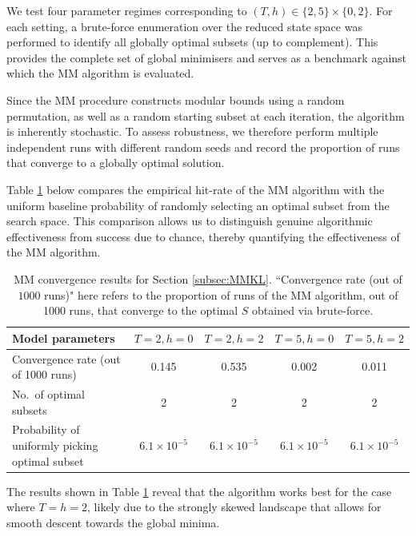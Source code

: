 \documentclass[EJP]{ejpecp} %
\begin{document}
We test four parameter regimes corresponding to $(T,h) \in \{2,5\} \times \{0,2\}$. For each setting, a brute-force enumeration over the reduced state space was performed to identify all globally optimal subsets (up to complement). This provides the complete set of global minimisers and serves as a benchmark against which the MM algorithm is evaluated.

Since the MM procedure constructs modular bounds using a random permutation, as well as a random starting subset at each iteration, the algorithm is inherently stochastic. To assess robustness, we therefore perform multiple independent runs with different random seeds and record the proportion of runs that converge to a globally optimal solution.

Table \ref{tab:secMMKL} below compares the empirical hit-rate of the MM algorithm with the uniform baseline probability of randomly selecting an optimal subset from the search space. This comparison allows us to distinguish genuine algorithmic effectiveness from success due to chance, thereby quantifying the effectiveness of the MM algorithm.


\begin{table}[ht]
    \centering
    \small
    \begin{tabular}{|p{3.8cm}|c|c|c|c|}
        \hline
        \textbf{Model parameters} 
        & $T=2, h=0$ 
        & $T=2, h=2$ 
        & $T=5, h=0$ 
        & $T=5, h=2$ \\
        \hline
        
        Convergence rate (out of 1000 runs) 
        & 0.145 & 0.535 & 0.002 & 0.011 \\
        \hline
        
        No.\ of optimal subsets 
        & 2 & 2 & 2 & 2 \\
        \hline
        
        Probability of uniformly picking optimal subset 
        & $6.1\times10^{-5}$ 
        & $6.1\times10^{-5}$ 
        & $6.1\times10^{-5}$ 
        & $6.1\times10^{-5}$ \\
        \hline
    \end{tabular}
    \caption{MM convergence results for Section \ref{subsec:MMKL}. ``Convergence rate (out of $1000$ runs)" here refers to the proportion of runs of the MM algorithm, out of 1000 runs, that converge to the optimal $S$ obtained via brute-force.}
    \label{tab:secMMKL}
\end{table}

The results shown in Table \ref{tab:secMMKL} reveal that the algorithm works best for the case where $T = h = 2$, likely due to the strongly skewed landscape that allows for smooth descent towards the global minima. 
\end{document}
